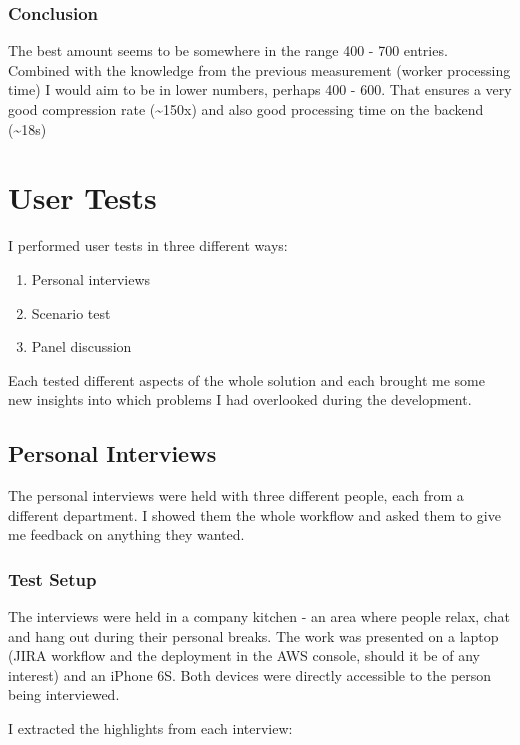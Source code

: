 \subsubsection*{Conclusion}

The best amount seems to be somewhere in the range 400 - 700 entries. Combined with the knowledge from the previous measurement (worker processing time) I would aim to be in lower numbers, perhaps 400 - 600. That ensures a very good compression rate (\textasciitilde 150x) and also good processing time on the backend (\textasciitilde 18s)

\newpage

\section{User Tests}

I performed user tests in three different ways:

\begin{enumerate}
	\item Personal interviews
	\item Scenario test
	\item Panel discussion
\end{enumerate}

Each tested different aspects of the whole solution and each brought me some new insights into which problems I had overlooked during the development.

\subsection{Personal Interviews}

The personal interviews were held with three different people, each from a different department. I showed them the whole workflow and asked them to give me feedback on anything they wanted.

\subsubsection{Test Setup}

The interviews were held in a company kitchen - an area where people relax, chat and hang out during their personal breaks. The work was presented on a laptop (JIRA workflow and the deployment in the AWS console, should it be of any interest) and an iPhone 6S. Both devices were directly accessible to the person being interviewed.

I extracted the highlights from each interview:

